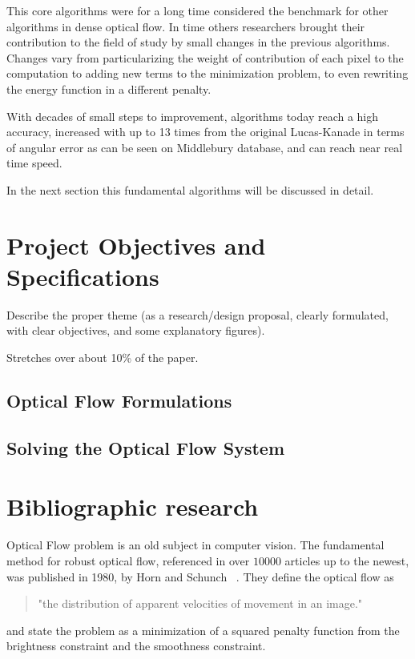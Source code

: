 \documentclass[12pt,a4paper,twoside]{report}
\begin{document}
This core algorithms were for a long time considered the benchmark for other algorithms in dense optical flow. 
In time others researchers brought their contribution to the field of study by small changes in the previous algorithms. Changes vary from particularizing the weight of contribution of each pixel to the computation to adding new terms to the minimization problem, to even rewriting the energy function in a different penalty. 

With decades of small steps to improvement, algorithms today reach a high accuracy, increased with up to 13 times from the original Lucas-Kanade in terms of angular error as can be seen on Middlebury database, and can reach near real time speed.

In the next section this fundamental algorithms will be discussed in detail.


\chapter{Project Objectives and Specifications}
{\color{red}{must be about 6 pages}}

Describe the proper theme (as a research/design proposal, clearly formulated, with clear objectives, and some explanatory figures).

Stretches over about 10\% of the paper.

\section{Optical Flow Formulations}
\section{Solving the Optical Flow System}

\chapter{Bibliographic research}


{\color{red}{must be about 9 pages}}

Optical Flow problem is an old subject in computer vision. The fundamental method for robust optical flow, referenced in over $10000$ articles up to the newest, was published in 1980, by Horn and Schunch ~\cite{HSOpticalFlow}. They define the optical flow as
\begin{quote}
"the distribution of apparent velocities of movement in an image."
\end{quote}
and state the problem as a minimization of a squared penalty function from the brightness constraint and the smoothness constraint.
\end{document}
